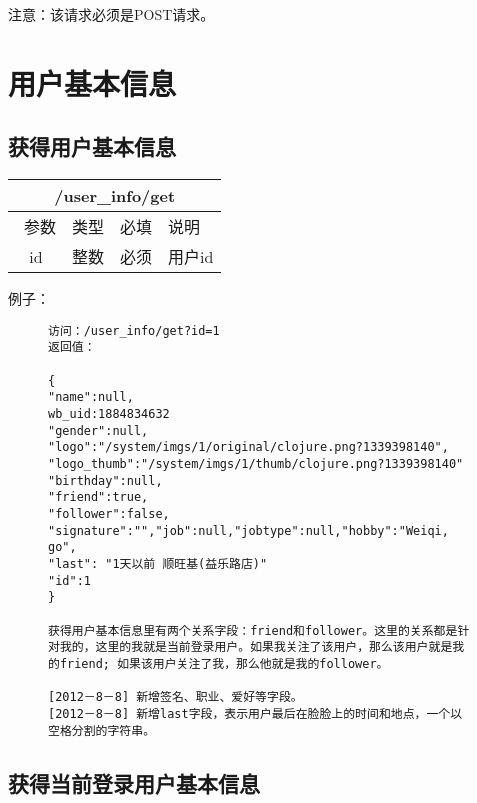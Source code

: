 \documentclass[cs4size]{ctexartutf8}
\begin{document}
注意：该请求必须是POST请求。





\section{用户基本信息}

\subsection{获得用户基本信息}

\begin{table}[H]
   \begin{center}
\begin{tabular}{|c|c|c|p{12cm}|}
\hline
\multicolumn{4}{|c|}{/user\_info/get} \\
\hline\hline
 \  参数  & 类型 & 必填 &  说明  \\
\hline
 id  & 整数 & 必须 &  用户id\\
\hline
\end{tabular}
   \end{center}
\end{table}



例子：

\begin{figure}[H]
\begin{verbatim}
访问：/user_info/get?id=1
返回值：

{
"name":null,
wb_uid:1884834632
"gender":null,
"logo":"/system/imgs/1/original/clojure.png?1339398140",
"logo_thumb":"/system/imgs/1/thumb/clojure.png?1339398140"
"birthday":null,
"friend":true,
"follower":false,
"signature":"","job":null,"jobtype":null,"hobby":"Weiqi, go",
"last": "1天以前 顺旺基(益乐路店)" 
"id":1
}

获得用户基本信息里有两个关系字段：friend和follower。这里的关系都是针对我的，这里的我就是当前登录用户。如果我关注了该用户，那么该用户就是我的friend; 如果该用户关注了我，那么他就是我的follower。

[2012－8－8] 新增签名、职业、爱好等字段。
[2012－8－8] 新增last字段，表示用户最后在脸脸上的时间和地点，一个以空格分割的字符串。

\end{verbatim}
\end{figure}



\subsection{获得当前登录用户基本信息}
\end{document}
